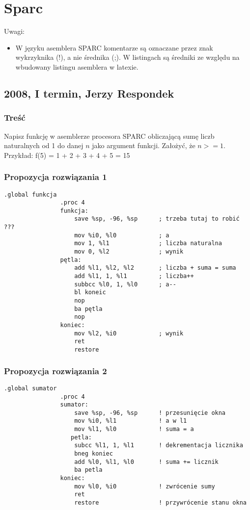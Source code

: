 \newpage

\section{Sparc}
	Uwagi:
	\begin{itemize}
		\item W języku asemblera SPARC komentarze są oznaczane przez znak wykrzyknika (!), a nie średnika (;). W listingach są średniki ze względu na wbudowany listingu asemblera w latexie.
	\end{itemize}

	\subsection{2008, I termin, Jerzy Respondek}
		\subsubsection{Treść}
			Napisz funkcję w asemblerze procesora SPARC obliczającą sumę liczb naturalnych od 1 do danej $ n $ jako argument funkcji. Założyć, że $ n >= 1 $.\\
			Przykład: f(5) = 1 + 2 + 3 + 4 + 5 = 15
		\subsubsection{Propozycja rozwiązania 1}
			\begin{lstlisting}[language={[sparc]Assembler}]
				.global funkcja
				.proc 4
				funkcja:
					save %sp, -96, %sp		; trzeba tutaj to robić ???
					mov %i0, %l0			; a
					mov 1, %l1				; liczba naturalna   
					mov 0, %l2				; wynik
				pętla:
					add %l1, %l2, %l2		; liczba + suma = suma
					add %l1, 1, %l1			; liczba++
					subbcc %l0, 1, %l0		; a--
					bl koneic
					nop
					ba pętla
					nop
				koniec:
					mov %l2, %i0			; wynik
					ret
					restore
			\end{lstlisting}
		\subsubsection{Propozycja rozwiązania 2}
			\begin{lstlisting}[language={[sparc]Assembler}]
			    .global sumator
			    .proc 4
			    sumator:
				    save %sp, -96, %sp		! przesunięcie okna
				    mov %i0, %l1			! a w l1
				    mov %l1, %l0			! suma = a
				   petla:
				    subcc %l1, 1, %l1		! dekrementacja licznika
				    bneg koniec
				    add %l0, %l1, %l0		! suma += licznik
				    ba petla
			    koniec:
				    mov %l0, %i0			! zwrócenie sumy
				    ret
				    restore					! przywrócenie stanu okna
			\end{lstlisting}
			
